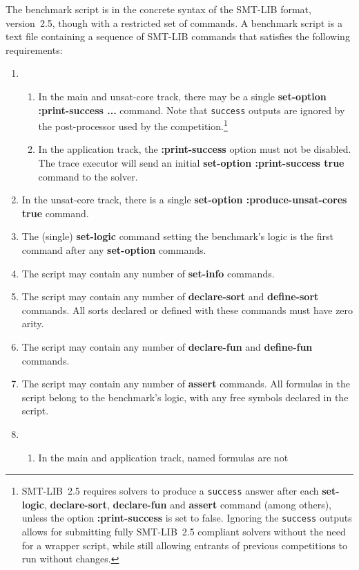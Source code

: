 \documentclass[12pt]{article}
\newcommand{\akey}[1]{\textbf{#1}}
\begin{document}
The benchmark script is in the concrete syntax of the SMT-LIB format,
version~2.5, though with a restricted set of commands.  A benchmark
script is a text file containing a sequence of SMT-LIB commands that
satisfies the following requirements:
%
\begin{enumerate}
\item
  \begin{enumerate}
  \item In the main and unsat-core track, there may be a single
    \akey{set-option :print-success ...} command.  Note that
    \texttt{success} outputs are ignored by the post-processor used by
    the competition.\footnote{SMT-LIB~2.5 requires solvers to produce
      a \texttt{success} answer after each \akey{set-logic},
      \akey{declare-sort}, \akey{declare-fun} and \akey{assert}
      command (among others), unless the option \akey{:print-success}
      is set to false.  Ignoring the \texttt{success} outputs allows
      for submitting fully SMT-LIB~2.5 compliant solvers without the
      need for a wrapper script, while still allowing entrants of
      previous competitions to run without changes.}
  \item In the application track, the \akey{:print-success} option
    must not be disabled.  The trace executor will send an initial
    \akey{set-option :print-success true} command to the solver.
  \end{enumerate}
\item In the unsat-core track, there is a single \akey{set-option
  :produce-unsat-cores true} command.
\item The (single) \akey{set-logic} command setting the benchmark's
  logic is the first command after any \akey{set-option} commands.
\item The script may contain any number of \akey{set-info} commands.
\item The script may contain any number of \akey{declare-sort} and
  \akey{define-sort} commands.  All sorts declared or defined with
  these commands must have zero arity.
\item The script may contain any number of \akey{declare-fun} and
  \akey{define-fun} commands.
\item The script may contain any number of \akey{assert} commands.
  All formulas in the script belong to the benchmark's logic, with any
  free symbols declared in the script.
\item
  \begin{enumerate}
    \item In the main and application track, named formulas are not

\end{enumerate}
\end{enumerate}
\end{document}
